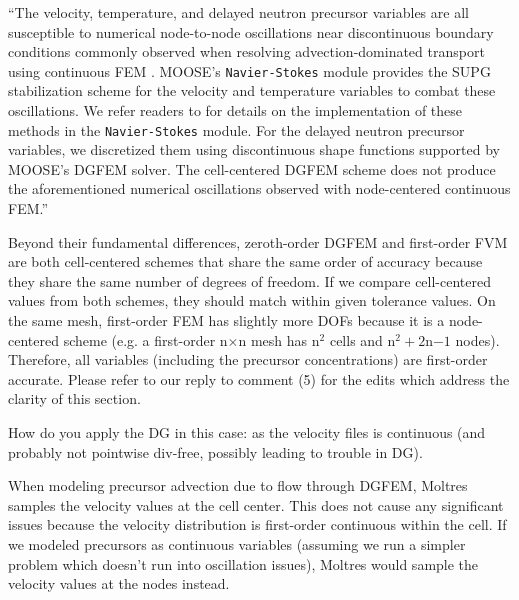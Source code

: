 \documentclass[answers,11pt]{exam}
\begin{document}
\begin{questions}
\begin{solution}
        	``The velocity, temperature, and delayed neutron precursor variables are all susceptible to numerical node-to-node oscillations near discontinuous boundary conditions commonly observed when resolving advection-dominated transport using continuous FEM \cite{kuhlmann_lid-driven_2018}. MOOSE's \texttt{Navier-Stokes} module provides the SUPG stabilization scheme \cite{brooks_streamline_1982} for the velocity and temperature variables to combat these oscillations. We refer readers to \cite{peterson_overview_2018} for details on the implementation of these methods in the \texttt{Navier-Stokes} module. For the delayed neutron precursor variables, we discretized them using discontinuous shape functions supported by MOOSE's DGFEM solver. The cell-centered DGFEM scheme does not produce the aforementioned numerical oscillations observed with node-centered continuous FEM.''
        	
        	Beyond their fundamental differences, zeroth-order DGFEM and
            first-order FVM are both cell-centered schemes that share the
            same order of accuracy because they share the
            same number of degrees of freedom. If we compare cell-centered
            values from both schemes, they should match within given
            tolerance values. On the same mesh, first-order
            FEM has slightly more DOFs because it is a node-centered scheme
            (e.g. a first-order n$\times$n mesh has n$^2$ cells and
            n$^2+2$n$-1$ nodes).
            Therefore, all variables (including the precursor concentrations)
            are first-order accurate. Please refer to our reply to comment (5)
            for the edits which address the clarity of this section.
        \end{solution}

        \question How do you apply the DG in this case: as the
        velocity files is continuous (and probably not pointwise div-free,
        possibly leading to trouble in DG).
        \begin{solution}
            When modeling precursor advection due to flow through DGFEM,
            Moltres samples the velocity values at the cell center. This
            does not cause any significant issues because the velocity
            distribution is first-order continuous within the cell. If we
            modeled precursors as continuous variables (assuming we run a
            simpler problem which doesn't run into oscillation issues), Moltres
            would sample the velocity values at the nodes instead.
            

\end{solution}
\end{questions}
\end{document}
